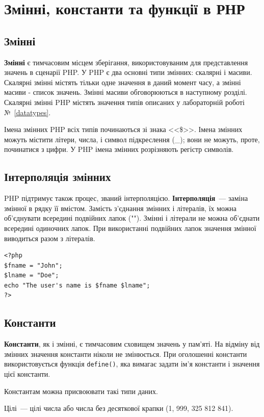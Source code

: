 \pagebreak[3]
\section{Змінні, константи та функції в РНР}
\nopagebreak[4]
\subsection*{Змінні}
\textbf{Змінні} є тимчасовим місцем зберігання, використовуваним для представлення значень в сценарії PHP. У PHP є два основні типи змінних: скалярні і масиви. Скалярні змінні містять тільки одне значення в даний момент часу, а змінні масиви - список значень. Змінні масиви обговорюються в наступному розділі. Скалярні змінні PHP містять значення типів описаних у лабораторній роботі №~\ref{datatypes}.

Імена змінних PHP всіх типів починаються зі знака <<\$>>. Імена змінних можуть містити літери, числа, і символ підкреслення (\_); вони не можуть, проте, починатися з цифри. У PHP імена змінних розрізняють регістр символів. 

\subsection*{Інтерполяція змінних}
PHP підтримує також процес, званий інтерполяцією. \textbf{Інтерполяція}~--- заміна змінної в рядку її вмістом. Замість з'єднання змінних і літералів, їх можна об'єднувати всередині подвійних лапок (""). Змінні і літерали не можна об'єднати всередині одиночних лапок. При використанні подвійних лапок значення змінної виводиться разом з літералів. 
\begin{verbatim}
<?php 
$fname = "John";
$lname = "Doe";
echo "The user's name is $fname $lname";
?>
\end{verbatim}
\subsection*{Константи}
\textbf{Константи}, як і змінні, є тимчасовим сховищем значень у пам'яті. На відміну від змінних значення константи ніколи не змінюється. При оголошенні константи використовується функція  \verb|define()|, яка вимагає задати ім'я константи і значення цієї константи.

Константам можна присвоювати такі типи даних.

Цілі~--- цілі числа або числа без десяткової крапки (1, 999, 325 812 841).

